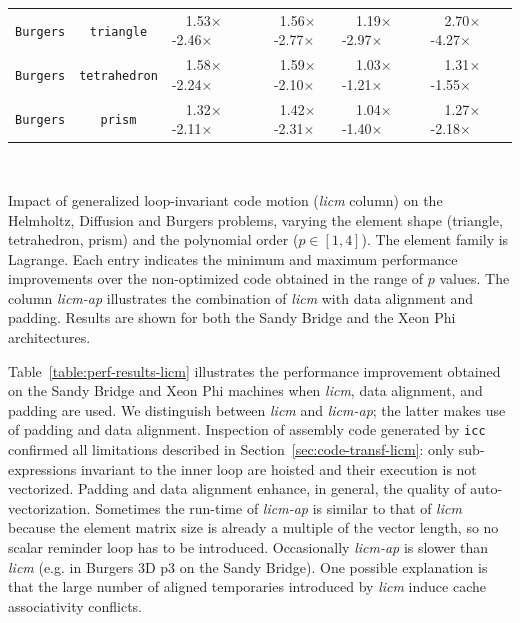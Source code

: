\documentclass[conference]{IEEEtran}
\begin{document}
{\begin{tabularx}{1.0\textwidth}{p{3.5cm}p{3.5cm}|p{2.25cm}p{2.25cm}p{2.25cm}p{2.25cm}|}
\cline{1-6}
\multicolumn{1}{|c|}{\texttt{Burgers}} & \multicolumn{1}{c|}{\texttt{triangle}} & ~~1.53$\times$-2.46$\times$ & \multicolumn{1}{c|}{~1.56$\times$-2.77$\times$} & ~~1.19$\times$-2.97$\times$ & ~~2.70$\times$-4.27$\times$ \\
\multicolumn{1}{|c|}{\texttt{Burgers}} & \multicolumn{1}{c|}{\texttt{tetrahedron}} & ~~1.58$\times$-2.24$\times$ & \multicolumn{1}{c|}{~1.59$\times$-2.10$\times$} & ~~1.03$\times$-1.21$\times$ & ~~1.31$\times$-1.55$\times$ \\
\multicolumn{1}{|c|}{\texttt{Burgers}} & \multicolumn{1}{c|}{\texttt{prism}} & ~~1.32$\times$-2.11$\times$ & \multicolumn{1}{c|}{~1.42$\times$-2.31$\times$} & ~~1.04$\times$-1.40$\times$ & ~~1.27$\times$-2.18$\times$ \\
\cline{1-6}
\end{tabularx}
}

\begin{table}[t]\small
\massmatrixtwodresultsnorms
~
\caption{Impact of generalized loop-invariant code motion (\emph{licm} column) on the Helmholtz, Diffusion and Burgers problems, varying the element shape (triangle, tetrahedron, prism) and the polynomial order ($p \in [1, 4]$). The element family is Lagrange. Each entry indicates the minimum and maximum performance improvements over the non-optimized code obtained in the range of $p$ values. The column \emph{licm-ap} illustrates the combination of \emph{licm} with data alignment and padding. Results are shown for both the Sandy Bridge and the Xeon Phi architectures.}
\label{table:perf-results-licm}
\end{table}

Table~\ref{table:perf-results-licm} illustrates the performance improvement obtained on the Sandy Bridge and Xeon Phi machines when \emph{licm}, data alignment, and padding are used. We distinguish between \emph{licm} and \emph{licm-ap}; the latter makes use of padding and data alignment. Inspection of assembly code generated by \texttt{icc} confirmed all limitations described in Section~\ref{sec:code-transf-licm}: only sub-expressions invariant to the inner loop are hoisted and their execution is not vectorized. Padding and data alignment enhance, in general, the quality of auto-vectorization. Sometimes the run-time of \emph{licm-ap} is similar to that of \emph{licm} because the element matrix size is already a multiple of the vector length, so no scalar reminder loop has to be introduced. Occasionally \emph{licm-ap} is slower than \emph{licm} (e.g. in Burgers 3D p3 on the Sandy Bridge). One possible explanation is that the large number of aligned temporaries introduced by \emph{licm} induce cache associativity conflicts.
\end{document}
